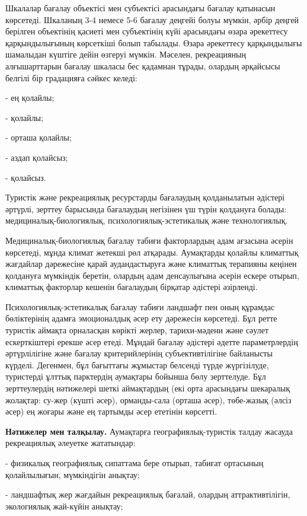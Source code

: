 \begin{multicols}{2}
Шкалалар бағалау объектісі мен субъектісі арасындағы бағалау қатынасын
көрсетеді. Шкаланың 3-4 немесе 5-6 бағалау деңгейі болуы мүмкін, әрбір
деңгей берілген объектінің қасиеті мен субъектінің күйі арасындағы өзара
әрекеттесу қарқындылығының көрсеткіші болып табылады. Өзара әрекеттесу
қарқындылығы шамалыдан күштіге дейін өзгеруі мүмкін. Мәселен,
рекреацияның алғышарттарын бағалау шкаласы бес қадамнан тұрады, олардың
әрқайсысы белгілі бір градацияға сәйкес келеді:

- ең қолайлы;

- қолайлы;

- орташа қолайлы;

- аздап қолайсыз;

- қолайсыз.

Туристік және рекреациялық ресурстарды бағалаудың қолданылатын әдістері
әртүрлі, зерттеу барысында бағалаудың негізінен үш түрін қолдануға
болады: медициналық-биологиялық, психологиялық-эстетикалық және
технологиялық.

Медициналық-биологиялық бағалау табиғи факторлардың адам ағзасына әсерін
көрсетеді, мұнда климат жетекші рөл атқарады. Аумақтарды қолайлы
климаттық жағдайлар дәрежесіне қарай аудандастыруға және климаттық
терапияны кеңінен қолдануға мүмкіндік беретін, олардың адам денсаулығына
әсерін ескере отырып, климаттық факторлар кешенін бағалаудың бірқатар
әдістері әзірленді.

Психологиялық-эстетикалық бағалау табиғи ландшафт пен оның құрамдас
бөліктерінің адамға эмоционалдық әсер ету дәрежесін көрсетеді. Бұл ретте
туристік аймақта орналасқан көрікті жерлер, тарихи-мәдени және сәулет
ескерткіштері ерекше әсер етеді. Мұндай бағалау әдістері әдетте
параметрлердің әртүрлілігіне және бағалау критерийлерінің
субъективтілігіне байланысты күрделі. Дегенмен, бұл бағыттағы жұмыстар
белсенді түрде жүргізілуде, туристерді ұлттық парктердің аумақтары
бойынша бөлу зерттелуде. Бұл зерттеулердің нәтижелері шеткі аймақтардың
(екі орта арасындағы шекаралық жолақтар: су-жер (күшті әсер),
орманды-сала (орташа әсер), төбе-жазық (әлсіз әсер) ең жоғары және ең
тартымды әсер ететінін көрсетті.

{\bfseries Нәтижелер мен талқылау.} Аумақтарға географиялық-туристік талдау
жасауда рекреациялық әлеуетке жататындар:

- физикалық географиялық сипаттама бере отырып, табиғат ортасының
қолайлылығын, мүмкіндігін анықтау;

- ландшафтық жер жағдайын рекреациялық бағалай, олардың
аттрактивтілігін, экологиялық жай-күйін анықтау;


\end{multicols}
